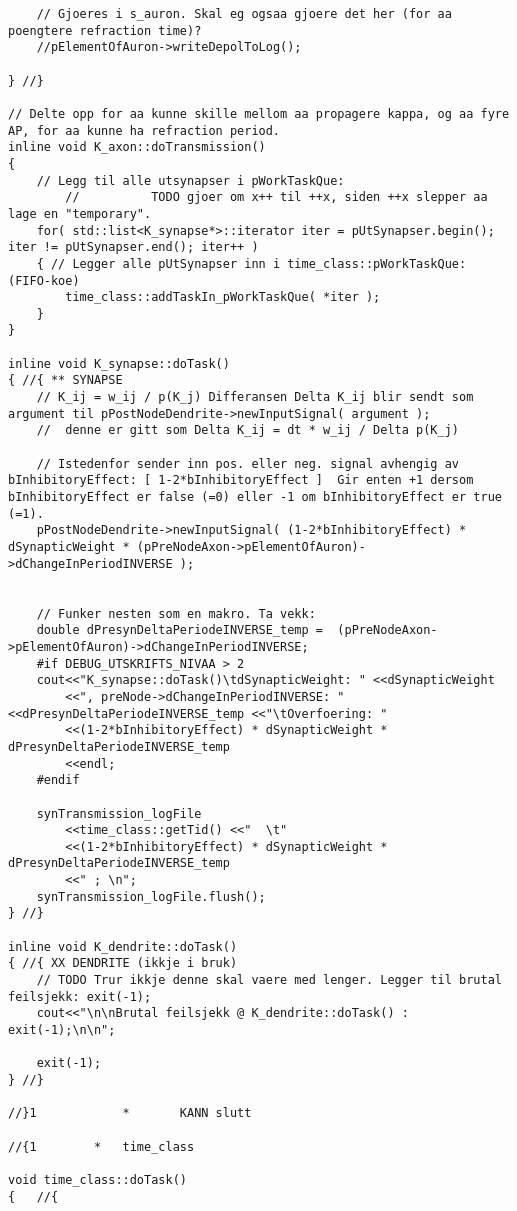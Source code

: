 \begin{lstlisting}
	// Gjoeres i s_auron. Skal eg ogsaa gjoere det her (for aa poengtere refraction time)?
	//pElementOfAuron->writeDepolToLog();

} //}

// Delte opp for aa kunne skille mellom aa propagere kappa, og aa fyre AP, for aa kunne ha refraction period.
inline void K_axon::doTransmission()
{
	// Legg til alle utsynapser i pWorkTaskQue:
		//			TODO gjoer om x++ til ++x, siden ++x slepper aa lage en "temporary".
 	for( std::list<K_synapse*>::iterator iter = pUtSynapser.begin(); iter != pUtSynapser.end(); iter++ )
	{ // Legger alle pUtSynapser inn i time_class::pWorkTaskQue: (FIFO-koe)
		time_class::addTaskIn_pWorkTaskQue( *iter );
	}
}

inline void K_synapse::doTask()
{ //{ ** SYNAPSE
	// K_ij = w_ij / p(K_j) Differansen Delta K_ij blir sendt som argument til pPostNodeDendrite->newInputSignal( argument );
	// 	denne er gitt som Delta K_ij = dt * w_ij / Delta p(K_j)

	// Istedenfor sender inn pos. eller neg. signal avhengig av bInhibitoryEffect: [ 1-2*bInhibitoryEffect ]  Gir enten +1 dersom bInhibitoryEffect er false (=0) eller -1 om bInhibitoryEffect er true (=1).
	pPostNodeDendrite->newInputSignal( (1-2*bInhibitoryEffect) * dSynapticWeight * (pPreNodeAxon->pElementOfAuron)->dChangeInPeriodINVERSE );

	
	// Funker nesten som en makro. Ta vekk:
	double dPresynDeltaPeriodeINVERSE_temp =  (pPreNodeAxon->pElementOfAuron)->dChangeInPeriodINVERSE;
	#if DEBUG_UTSKRIFTS_NIVAA > 2
 	cout<<"K_synapse::doTask()\tdSynapticWeight: " <<dSynapticWeight 
		<<", preNode->dChangeInPeriodINVERSE: " <<dPresynDeltaPeriodeINVERSE_temp <<"\tOverfoering: "
		<<(1-2*bInhibitoryEffect) * dSynapticWeight * dPresynDeltaPeriodeINVERSE_temp
		<<endl;
	#endif

	synTransmission_logFile
		<<time_class::getTid() <<"  \t"
		<<(1-2*bInhibitoryEffect) * dSynapticWeight * dPresynDeltaPeriodeINVERSE_temp
		<<" ; \n";
	synTransmission_logFile.flush();
} //}

inline void K_dendrite::doTask()
{ //{ XX DENDRITE (ikkje i bruk)
	// TODO Trur ikkje denne skal vaere med lenger. Legger til brutal feilsjekk: exit(-1);
	cout<<"\n\nBrutal feilsjekk @ K_dendrite::doTask() : exit(-1);\n\n";

	exit(-1);
} //}

//}1            *       KANN slutt

//{1 		* 	time_class

void time_class::doTask()
{ 	//{ 


\end{lstlisting}
